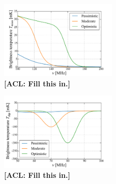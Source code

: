 \documentclass[twolcolumn,apj,iop,numberedappendix]{emulateapj}
\newcommand{\acl}[1]{{\color{red} \textbf{[ACL:  #1]}}}
\begin{document}
\begin{figure}[h]
	\centering
	\includegraphics[width=0.5\textwidth]{figures/reionScenarios.pdf}
	\caption{\acl{Fill this in.}}
	\label{fig:reionScenarios}
\end{figure}


\begin{figure}[h]
	\centering
	\includegraphics[width=0.5\textwidth]{figures/dipScenarios.pdf}
	\caption{\acl{Fill this in.}}
	\label{fig:dipScenarios}
\end{figure}
\end{document}
